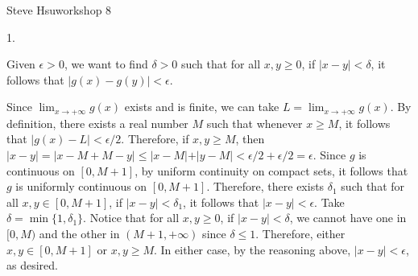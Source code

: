 \def\abs#1{\vert#1\vert}
\centerline{Steve Hsu\hfill workshop 8}
\item{1.}

Given $\epsilon > 0$, we want to find $\delta > 0$ such that
for all $x, y \ge 0$, if $\abs{x - y} < \delta$, it follows that
$\abs{g(x) - g(y)} < \epsilon$.

Since $\lim _{x \to +\infty} g(x)$ exists and is finite,
we can take $L = \lim _{x \to +\infty} g(x)$.
By definition, there exists a real number $M$ such that
whenever $x \ge M$, it follows that $\abs{g(x) - L} < \epsilon/2$.
Therefore, if $x, y \ge M$, then $\abs{x - y} = \abs{x - M + M - y} \le
\abs{x - M} + \abs{y - M} < \epsilon/2 + \epsilon/2 = \epsilon$.
Since $g$ is continuous on $[0,M+1]$, by uniform continuity on compact sets,
it follows that $g$ is uniformly continuous on $[0,M+1]$.
Therefore, there exists $\delta _1$ such that for all $x, y \in [0,M+1]$,
if $\abs{x - y} < \delta _1$, it follows that $\abs{x - y} < \epsilon$.
Take $\delta = \min \{1, \delta _1\}$.
Notice that for all $x, y \ge 0$, if $\abs{x - y} < \delta$,
we cannot have one in $[0,M)$ and the other in $(M+1,+\infty)$
since $\delta \le 1$.
Therefore, either $x, y \in [0,M+1]$ or $x, y \ge M$.
In either case, by the reasoning above, $\abs{x - y} < \epsilon$, as desired.
\bye
